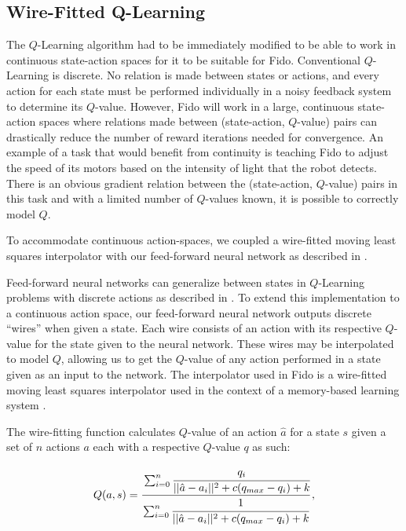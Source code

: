 \subsection{Wire-Fitted Q-Learning}

The $Q$-Learning algorithm had to be immediately modified to be able to work in continuous state-action spaces for it to be suitable for Fido.
Conventional $Q$-Learning is discrete.
No relation is made between states or actions, and every action for each state must be performed individually in a noisy feedback system to determine its $Q$-value.
However, Fido will work in a large, continuous state-action spaces where relations made between (state-action, $Q$-value) pairs can drastically reduce the number of reward iterations needed for convergence.
An example of a task that would benefit from continuity is teaching Fido to adjust the speed of its motors based on the intensity of light that the robot detects.
There is an obvious gradient relation between the (state-action, $Q$-value) pairs in this task and with a limited number of $Q$-values known, it is possible to correctly model $Q$.

To accommodate continuous action-spaces, we coupled a wire-fitted moving least squares interpolator with our feed-forward neural network as described in \cite{gaskett}.

Feed-forward neural networks can generalize between states in $Q$-Learning problems with discrete actions as described in \cite{rummery}.
To extend this implementation to a continuous action space, our feed-forward neural network outputs discrete ``wires'' when given a state.
Each wire consists of an action with its respective $Q$-value for the state given to the neural network.
These wires may be interpolated to model $Q$, allowing us to get the $Q$-value of any action performed in a state given as an input to the network.
The interpolator used in Fido is a wire-fitted moving least squares interpolator used in the context of a memory-based learning system \cite{baird}.

The wire-fitting function calculates $Q$-value of an action $\hat{a}$ for a state $s$ given a set of $n$ actions $a$ each with a respective $Q$-value $q$ as such:

\begin{equation}
	Q(a, s) = \cfrac{\sum_{i=0}^{n}\cfrac{q_i}{||\hat{a}-a_i||^2+c(q_{max}-q_i)+k}}{\sum_{i=0}^{n}\cfrac{1}{||\hat{a}-a_i||^2+c(q_{max}-q_i)+k}}
	\,,
\end{equation}

